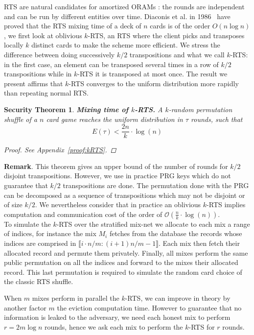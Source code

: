 \documentclass{llncs}
\newtheorem{secthm}{Security Theorem}
\begin{document}
RTS are natural candidates for amortized ORAMs : the rounds are independent and can be run by different entities over time. 
Diaconis et al. in 1986~\cite{aldous1986shuffling} have proved that the RTS mixing time of a deck of $n$ cards is of the order  $O\left(n\log n \right)$, we first look at oblivious $k$-RTS, an RTS where the client picks and transposes locally $k$ distinct cards to make the scheme more efficient. We stress the difference between doing successively $k/2$ transpositions and what we call $k$-RTS: in the first case, an element can be transposed several times in a row of $k/2$ transpositions while in $k$-RTS it is transposed at most once. The result we present affirms that  $k$-RTS converges to the uniform distribution more rapidly than repeating normal RTS.  

\begin{secthm}
\textbf{Mixing time of $k$-RTS.} A $k$-random permutation shuffle of a $n$ card game reaches the uniform distribution in $\tau$ rounds, such that
$$E(\tau) < \frac{2 n}{k}\cdot \log(n)$$
\begin{proof}
See Appendix~\ref{proof:kRTS}.
\end{proof}
\end{secthm}

\textbf{Remark}. This theorem gives an upper bound of the number of rounds for $k/2$ disjoint transpositions. However, we use in practice PRG keys which do not guarantee that $k/2$ transpositions are done. The permutation done with the PRG can be decomposed as a sequence of transpositions which may not be disjoint or of size $k/2$. We nevertheless consider that in practice an oblivious $k$-RTS implies computation and communication cost of the order of $\mathcal{O} \left(\frac{n}{k}\cdot \log(n)\right)$.\\

To simulate the $k$-RTS over the stratified mix-net we allocate to each mix a range of indices, for instance the mix $M_i$ fetches from the database the records whose indices are comprised in $\llbracket i\cdot n/m : (i+1)n/m -1 \rrbracket$. Each mix then fetch their allocated record and permute them privately. Finally, all mixes perform the same public permutation on all the indices and forward to the mixes their allocated record. This last permutation is required to simulate the random card choice of the classic RTS shuffle. 

When $m$ mixes perform in parallel the $k$-RTS, we can improve in theory by another factor $m$ the eviction computation time. However to guarantee that no information is leaked to the adversary, we need each honest mix to perform $r=2 m\log n$ rounds, hence we ask each mix to perform the $k$-RTS for $r$ rounds.
%
\end{document}
